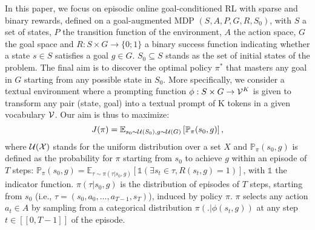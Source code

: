 In this paper, we focus on episodic online goal-conditioned RL with sparse and binary rewards, defined on %
a goal-augmented MDP $(S, A, P, G, R, S_0)$, with $S$ a set of states, $P$ the transition function of the environment, $A$ the action space, $G$ the goal space and $R:S\times G \rightarrow \{0;1\}$  a binary success function indicating whether a state $s \in S$ satisfies a goal $g \in G$. $S_0 \subseteq S$ stands as the set of initial states of the problem. The final aim is to discover the optimal policy $\pi^*$ that masters any goal in $G$ starting from any possible state in $S_0$. More specifically, we consider a textual environment where a prompting function $\phi:S\times G \rightarrow {\cal V}^K$ is given to transform any pair (state, goal) into a textual prompt of K tokens in a given vocabulary ${\cal V}$. %
Our aim is thus to maximize: 
$$J(\pi)=\mathbb{E}_{s_0 \sim {\cal U}(S_0), g \sim {\cal U}(G)} \left[\mathbb{P}_\pi(s_0,g) \right], $$
where $\cal U(\cal X)$ stands for the uniform distribution over a  set $X$ and $\mathbb{P}_\pi(s_0,g)$ is defined as the probability for $\pi$ starting from $s_0$ to achieve $g$ within an episode of $T$ steps: $\mathbb{P}_\pi(s_0,g) = \mathbb{E}_{\tau \sim \pi(\tau|s_0,g)}[\mathds{1}(\exists s_t \in \tau, R(s_t,g)=1)]$, with $\mathds{1}$ the indicator function. $\pi(\tau|s_0,g)$ is the distribution of episodes of $T$ steps,  starting from $s_0$ (i.e., $\tau=(s_0,a_0, %
\ldots, a_{T-1}, s_T)$),  induced by policy $\pi$. $\pi$  selects any action $a_t \in A$ by sampling from a categorical distribution $\pi(.|\phi(s_t, g))$ at any step $t \in [[0,T-1]]$ of the episode.   


